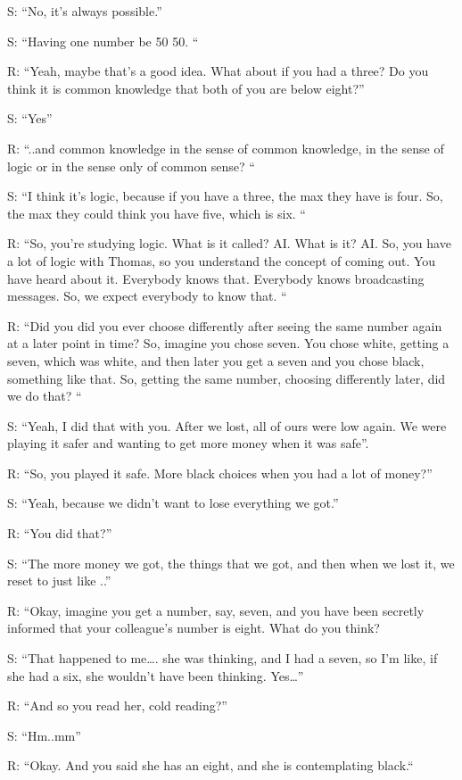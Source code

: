 S: “No, it's always possible.” 

S: “Having one number be 50 50. “

R: “Yeah, maybe that's a good idea. What about if you had a three? Do you think it is common knowledge that both of you are below eight?”

S: “Yes”

R: “..and common knowledge in the sense of common knowledge, in the sense of logic or in the sense only of common sense? “

S: “I think it's logic, because if you have a three, the max they have is four. So, the max they could think you have five, which is six. “

R: “So, you're studying logic. What is it called? AI. What is it? AI. So, you have a lot of logic with Thomas, so you understand the concept of coming out. You have heard about it. Everybody knows that. Everybody knows broadcasting messages. So, we expect everybody to know that. “

R: “Did you did you ever choose differently after seeing the same number again at a later point in time? So, imagine you chose seven. You chose white, getting a seven, which was white, and then later you get a seven and you chose black, something like that. So, getting the same number, choosing differently later, did we do that? “

S: “Yeah, I did that with you. After we lost, all of ours were low again. We were playing it safer and wanting to get more money when it was safe”.

R: “So, you played it safe. More black choices when you had a lot of money?”

S: “Yeah, because we didn't want to lose everything we got.”
 
R: “You did that?”

S: “The more money we got, the things that we got, and then when we lost it, we reset to just like ..”

R: “Okay, imagine you get a number, say, seven, and you have been secretly informed that your colleague's number is eight. What do you think?

S: “That happened to me…. she was thinking, and I had a seven, so I'm like, if she had a six, she wouldn't have been thinking. Yes…” 

R: “And so you read her, cold reading?”

S: “Hm..mm”


R: “Okay. And you said she has an eight, and she is contemplating black.“

